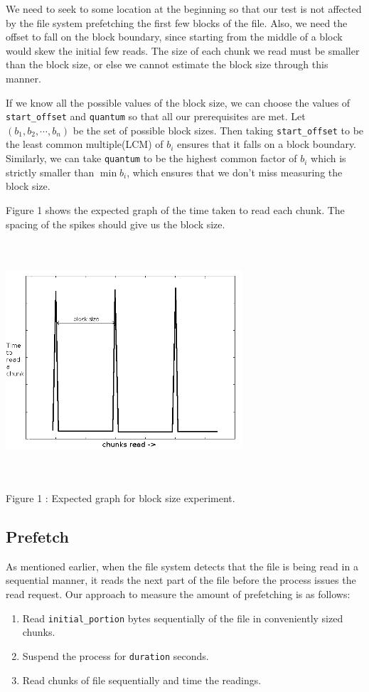 \documentclass[twocolumn,11pt]{article}
\begin{document}
\begin{sloppypar}
We need to seek to some location at the beginning so that our test is not affected by
the file system prefetching the first few blocks of the file. Also, we need the offset
to fall on the block boundary, since starting from the middle of a block would skew the
initial few reads. The size of each chunk we read must be smaller than the block size,
or else we cannot estimate the block size through this manner.

If we know all the possible values of the block size, we can choose the values of
{\tt start\_offset} and {\tt quantum} so that all our prerequisites are met. Let
$(b_1,b_2,\cdots,b_n)$ be the set of possible block sizes. Then taking 
{\tt start\_offset} to be the least common multiple(LCM) of $b_i$ ensures that it
falls on a block boundary. Similarly, we can take {\tt quantum} to be the highest
common factor of $b_i$ which is strictly smaller than $\min b_i$, which ensures
that we don't miss measuring the block size.

Figure 1 shows the expected graph of the time taken to read each chunk. The spacing of
the spikes should give us the block size.

\includegraphics[width=250pt,height=250pt]{buffer_ideal.png}
\begin{center}
Figure 1 : Expected graph for block size experiment.
\end{center}

\subsection{Prefetch}

As mentioned earlier, when the file system detects that the file is being read in a 
sequential manner, it reads the next part of the file before the process issues the read
request. Our approach to measure the amount of prefetching is as follows:
\begin{enumerate}
	\item Read {\tt initial\_portion} bytes sequentially of the file in conveniently sized chunks.
	\item Suspend the process for {\tt duration} seconds.
	\item Read chunks of file sequentially and time the readings.
\end{enumerate}


\end{sloppypar}
\end{document}
